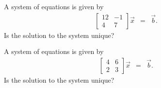 

\begin{problem}
\item 

  \begin{subproblem}
  \item A system of equations is given by
    \begin{eqnarray*}
      \left[
        \begin{array}{rr}
          12 & -1 \\
          4 & 7
        \end{array}
      \right] \vec{x} & = & \vec{b}.
    \end{eqnarray*}
    Is the solution to the system unique?
    \vfill

  \item A system of equations is given by
    \begin{eqnarray*}
      \left[
        \begin{array}{rr}
          4 & 6 \\
          2 & 3
        \end{array}
      \right] \vec{x} & = & \vec{b}.
    \end{eqnarray*}
    Is the solution to the system unique?
    \vfill
      
  \end{subproblem}
\end{problem}

